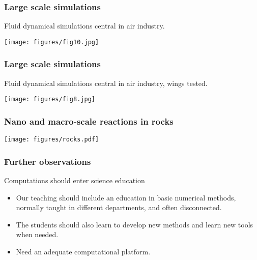 \documentclass{beamer}
\begin{document}
\begin{frame}
\frametitle{Large scale simulations}

\begin{block}{}
Fluid dynamical simulations central in air industry.


\centerline{\texttt{[image: figures/fig10.jpg]}}



\end{block}
\end{frame}

\begin{frame}
\frametitle{Large scale simulations}

\begin{block}{}
Fluid dynamical simulations central in air industry, wings tested.


\centerline{\texttt{[image: figures/fig8.jpg]}}



\end{block}
\end{frame}

\begin{frame}
\frametitle{Nano and macro-scale reactions in rocks}

\begin{block}{}


\centerline{\texttt{[image: figures/rocks.pdf]}}



\end{block}
\end{frame}

\begin{frame}
\frametitle{Further observations}

\begin{block}{Computations should enter science education  }

\begin{itemize}
\item Our teaching should include  an education in basic numerical methods, normally taught in different departments, and often disconnected. 

\item The students should also learn to develop new methods and learn new tools when needed.

\item Need an adequate computational platform.
\end{itemize}

\noindent
\end{block}
\end{frame}
\end{document}
